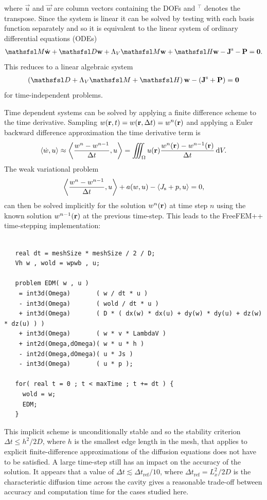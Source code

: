 \documentclass[a4paper]{article}
\numberwithin{equation}{section}
\begin{document}
where $\vec{u}$ and $\vec{w}$ are column vectors containing the DOFs and ${}^\intercal$ denotes the transpose. 
Since the system is linear it can be solved by testing with each basis function separately and so it is
equivalent to the linear system of ordinary differential equations (ODEs)
\begin{align}
\mM \dot{\vec{w}} + \mD \vec{w} +\Lambda_V \mM \vec{w}+ \mH \vec{w}
-\vec{J}^\rs -\vec{P} = \vzero.
\end{align}
This reduces to a linear algebraic system 
\begin{align}
\left( \mD +\Lambda_V \mM + \mH \right) \vec{w} - \left( \vec{J}^\rs + \vec{P} \right) = \vzero
\end{align}
for time-independent problems. 

Time dependent systems can be solved by applying a finite difference
scheme to the time derivative. Sampling $w(\boldsymbol{\mathrm{r}},t)=w(\boldsymbol{\mathrm{r}},\Delta t)=w^n(\boldsymbol{\mathrm{r}})$
and applying a Euler backward difference approximation the time
derivative term is
\begin{align}
\langle \dot{w},u \rangle \approx
\left\langle \frac{w^n-w^{n-1}}{\Delta t},u \right\rangle
=\iiint_{\Omega} u(\boldsymbol{\mathrm{r}})  \frac{w^n(\boldsymbol{\mathrm{r}})-w^{n-1}(\boldsymbol{\mathrm{r}})}{\Delta t} \,\mathrm{d}{V}.
\end{align}
The weak variational problem
\begin{align}
\left\langle \frac{w^n-w^{n-1}}{\Delta t},u \right\rangle
+ a(w,u) - \langle J_{\mathrm{s}}+p ,u \rangle = 0,
\end{align}
can then be solved implicitly for the solution $w^n(\boldsymbol{\mathrm{r}})$ at time step $n$
using the known solution $w^{n-1}(\boldsymbol{\mathrm{r}})$ at the previous time-step. This 
leads to the FreeFEM++ time-stepping implementation:
\begin{verbatim}

   real dt = meshSize * meshSize / 2 / D;
   Vh w , wold = wpwb , u;

   problem EDM( w , u ) 
    = int3d(Omega)       ( w / dt * u )
    - int3d(Omega)       ( wold / dt * u )
    + int3d(Omega)       ( D * ( dx(w) * dx(u) + dy(w) * dy(u) + dz(w) * dz(u) ) )
    + int3d(Omega)       ( w * v * LambdaV )
    + int2d(Omega,dOmega)( w * u * h )   
    - int2d(Omega,dOmega)( u * Js )
    - int3d(Omega)       ( u * p );
    
   for( real t = 0 ; t < maxTime ; t += dt ) {
     wold = w;
     EDM;
   }

\end{verbatim}
This implicit scheme is unconditionally stable and so the stability criterion 
$\Delta t \leq h^2/2D$, where $h$ is the smallest edge length in the mesh, 
that applies to explicit finite-difference approximations of
the diffusion equations does not have to be satisfied. A large time-step still
has an impact on the accuracy of the solution. It appears that a value of
$\Delta t \lesssim {\Delta t}_\mathrm{ref} / 10$, where ${\Delta t}_\mathrm{ref}=L_x^2/2D$
is the characteristic diffusion time across the cavity gives a reasonable trade-off between accuracy
and computation time for the cases studied here.
\end{document}
